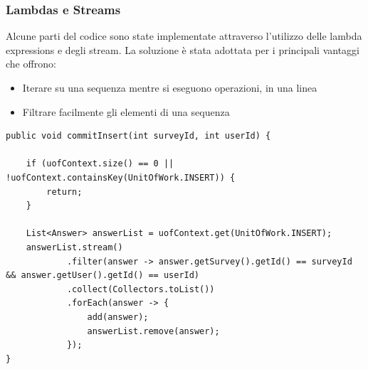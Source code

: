 \documentclass[12pt]{article}
\begin{document}
\subsubsection{Lambdas e Streams}
Alcune parti del codice sono state implementate attraverso l'utilizzo delle lambda expressions e degli stream. La soluzione è stata adottata per i principali vantaggi che offrono: 
\begin{itemize}
    \item Iterare su una sequenza mentre si eseguono operazioni, in una linea
    \item Filtrare facilmente gli elementi di una sequenza
\end{itemize}
 \begin{lstlisting}
public void commitInsert(int surveyId, int userId) {

	if (uofContext.size() == 0 || !uofContext.containsKey(UnitOfWork.INSERT)) {
		return;
	}

	List<Answer> answerList = uofContext.get(UnitOfWork.INSERT);
	answerList.stream()
			.filter(answer -> answer.getSurvey().getId() == surveyId && answer.getUser().getId() == userId)
			.collect(Collectors.toList())
			.forEach(answer -> {
				add(answer);
				answerList.remove(answer);
			});
}
\end{lstlisting}

\end{document}
